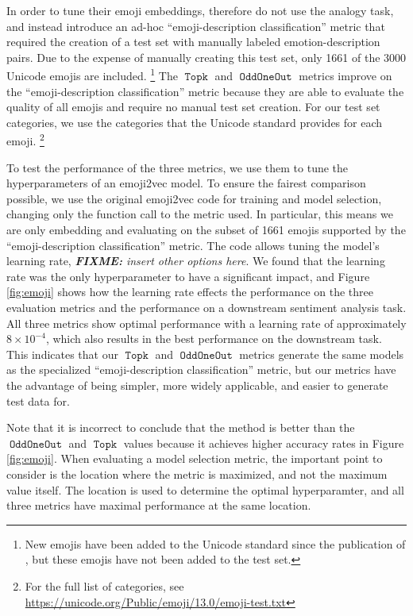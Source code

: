 \documentclass[11pt,a4paper]{article}
\DeclareMathOperator{\OddOneOut}{\texttt{OddOneOut}}
\DeclareMathOperator{\topk}{\texttt{Topk}}
\newcommand{\fixme}[1]{{\color{red}\itshape \textbf{FIXME:} {#1}}}
\begin{document}
In order to tune their emoji embeddings, \citet{eisner2016emoji2vec} therefore do not use the analogy task,
and instead introduce an ad-hoc ``emoji-description classification'' metric that required the creation of a test set with manually labeled emotion-description pairs.
Due to the expense of manually creating this test set,
only 1661 of the 3000 Unicode emojis are included.%
\footnote{New emojis have been added to the Unicode standard since the publication of \citet{eisner2016emoji2vec},
but these emojis have not been added to the test set.
}
The $\topk$ and $\OddOneOut$ metrics improve on the ``emoji-description classification'' metric because they are able to evaluate the quality of all emojis and require no manual test set creation.
For our test set categories, we use the categories that the Unicode standard provides for each emoji.%
\footnote{For the full list of categories, see \url{https://unicode.org/Public/emoji/13.0/emoji-test.txt}}

To test the performance of the three metrics,
we use them to tune the hyperparameters of an emoji2vec model.
To ensure the fairest comparison possible, we use the original emoji2vec code for training and model selection,
changing only the function call to the metric used.
In particular, this means we are only embedding and evaluating on the subset of 1661 emojis supported by the ``emoji-description classification'' metric.
The code allows tuning the model's learning rate, \fixme{insert other options here}.
We found that the learning rate was the only hyperparameter to have a significant impact,
and Figure \ref{fig:emoji} shows how the learning rate effects the performance on the three evaluation metrics and the performance on a downstream sentiment analysis task.
All three metrics show optimal performance with a learning rate of approximately $8\times10^{-4}$,
which also results in the best performance on the downstream task.
This indicates that our $\topk$ and $\OddOneOut$ metrics generate the same models as the specialized ``emoji-description classification'' metric,
but our metrics have the advantage of being simpler, more widely applicable, and easier to generate test data for.

Note that it is incorrect to conclude that the \citet{eisner2016emoji2vec} method is better than the $\OddOneOut$ and $\topk$ values because it achieves higher accuracy rates in Figure \ref{fig:emoji}.
When evaluating a model selection metric,
the important point to consider is the location where the metric is maximized,
and not the maximum value itself.
The location is used to determine the optimal hyperparamter,
and all three metrics have maximal performance at the same location.
\end{document}
